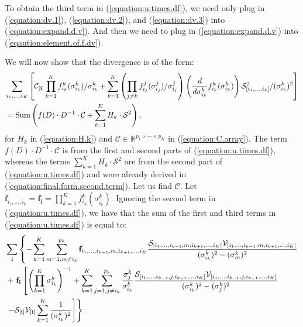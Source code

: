 To obtain the third term in (\ref{equation:u.times.df}), we need only plug in (\ref{equation:dv.1}), (\ref{equation:dv.2}), and (\ref{equation:dv.3}) into (\ref{equation:expand.d.v}). And then we need to plug in (\ref{equation:expand.d.v}) into (\ref{eqaution:element.of.f.dv}).

We will now show that the divergence is of the form:
\begin{align}
&\sum_{i_1,\ldots,i_K} \left[\mathcal{C}_{[\mathbf{i}]}\prod_{k=1}^Kf_{i_k}^k(\sigma_{i_k}^k)/\sigma_{i_k}^k + \sum_{k=1}^K \left(\prod_{j\neq k}f_{i_j}^j(\sigma_{i_j}^j)/\sigma_{i_j}^j\right)\left(\frac{d}{d\sigma_{i_k}^k}f_{i_k}^k(\sigma_{i_k}^k)\right)\mathcal{S}_{[i_1,\ldots,i_k]}^2/(\sigma_{i_k}^k)^2\right]\nonumber\\
&= \operatorname*{Sum}\left(f(D) \cdot D^{-1}\cdot \mathcal{C} + \sum_{k=1}^KH_k \cdot \mathcal{S}^2\right), \nonumber
\end{align}
for $H_k$ in (\ref{equation:H.k}) and $\mathcal{C} \in \mathbb{R}^{p_1\times\cdots\times p_K}$ in (\ref{equation:C.array}). The term $f(D) \cdot D^{-1}\cdot \mathcal{C}$ is from the first and second parts of (\ref{equation:u.times.df}), whereas the terms $\sum_{k=1}^KH_k \cdot \mathcal{S}^2$ are from the second part of (\ref{equation:u.times.df}) and were already derived in (\ref{equation:final.form.second.term}). Let us find $\mathcal{C}$.
Let $\mathbf{f}_{i_1,\ldots,i_k} = \mathbf{f}_{\mathbf{i}} =  \prod_{k=1}^Kf_{i_k}^k(\sigma_{i_k}^k)$. Ignoring the second term in (\ref{equation:u.times.df}), we have that the sum of the first and third terms in (\ref{equation:u.times.df}) is equal to:
\begin{align*}
\begin{split}
&\sum_{\bf i} \left\{ -\sum_{k=1}^K  \sum_{m=1,m\neq i_k}^{p_k} \mathbf{f}_{i_1,\ldots,i_{k-1},m,i_{k+1},\ldots,i_K}\frac{\mathcal{S}_{[i_1,\ldots,i_{k-1},m,i_{k+1},\ldots,i_K]}\mathcal{V}_{[i_1,\ldots,i_{k-1},m,i_{k+1},\ldots,i_K]}}{(\sigma_{i_k}^k)^2 - (\sigma_{m}^k)^2} \right.\\
&\left. +\ \mathbf{f}_{\bf i}\left[ \left(\prod_{k=1}^K \sigma_{i_k}^k\right)^{-1} + \sum_{k=1}^K \sum_{j = 1, j\neq i_k}^{p_k} \frac{\sigma_j^k}{\sigma_{i_k}^k} \frac{\mathcal{S}_{[i_1,\ldots,i_{k-1},j,i_{k+1},\ldots,i_K]}\mathcal{V}_{[i_1,\ldots,i_{k-1},j,i_{k+1},\ldots,i_K]}}{(\sigma_{i_k}^k)^2 - (\sigma_{j}^k)^2}\right.\right.\\
&\left.\left.- \mathcal{S}_{\bf [i]} \mathcal{V}_{\bf [i]}\sum_{k=1}^K \frac{1}{(\sigma_{i_k}^k)^2}\right]\right\}.
\end{split}
\end{align*}
